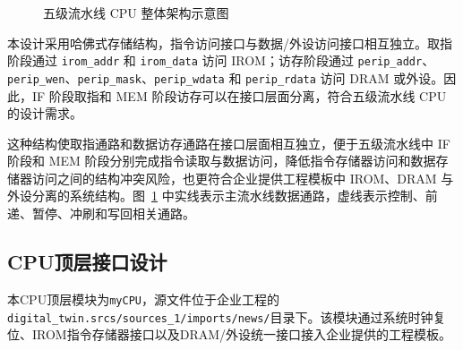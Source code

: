 \documentclass[UTF8,a4paper,12pt]{ctexart}
\newcommand{\code}[1]{\texttt{#1}}
\begin{document}
\begin{figure}[H]
{
}
\caption{五级流水线 CPU 整体架构示意图}
\label{fig:cpu_arch}
\end{figure}
本设计采用哈佛式存储结构，指令访问接口与数据/外设访问接口相互独立。取指阶段通过 \texttt{irom\_addr} 和 \texttt{irom\_data} 访问 IROM；访存阶段通过 \texttt{perip\_addr}、\texttt{perip\_wen}、\texttt{perip\_mask}、\texttt{perip\_wdata} 和 \texttt{perip\_rdata} 访问 DRAM 或外设。因此，IF 阶段取指和 MEM 阶段访存可以在接口层面分离，符合五级流水线 CPU 的设计需求。

这种结构使取指通路和数据访存通路在接口层面相互独立，便于五级流水线中 IF 阶段和 MEM 阶段分别完成指令读取与数据访问，降低指令存储器访问和数据存储器访问之间的结构冲突风险，也更符合企业提供工程模板中 IROM、DRAM 与外设分离的系统结构。图~\ref{fig:cpu_arch} 中实线表示主流水线数据通路，虚线表示控制、前递、暂停、冲刷和写回相关通路。

\subsection{CPU顶层接口设计}

本CPU顶层模块为\code{myCPU}，源文件位于企业工程的\code{digital\_twin.srcs/sources\_1/imports/news/}目录下。该模块通过系统时钟复位、IROM指令存储器接口以及DRAM/外设统一接口接入企业提供的工程模板。
\end{document}
